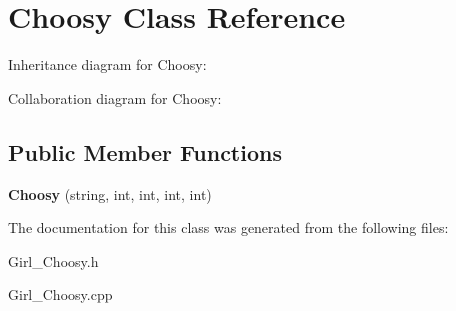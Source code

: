 \hypertarget{classChoosy}{}\section{Choosy Class Reference}
\label{classChoosy}


Inheritance diagram for Choosy\+:


Collaboration diagram for Choosy\+:
\subsection*{Public Member Functions}
\begin{DoxyCompactItemize}
\item 
{\bfseries Choosy} (string, int, int, int, int)\hypertarget{classChoosy_a749e3a4606fb9bc11fab3131324ba92b}{}\label{classChoosy_a749e3a4606fb9bc11fab3131324ba92b}

\end{DoxyCompactItemize}


The documentation for this class was generated from the following files\+:\begin{DoxyCompactItemize}
\item 
Girl\+\_\+\+Choosy.\+h\item 
Girl\+\_\+\+Choosy.\+cpp\end{DoxyCompactItemize}
